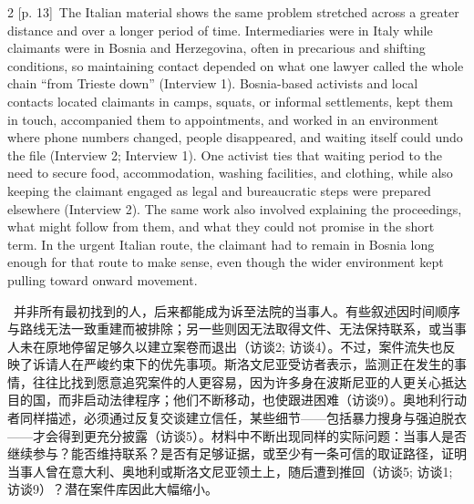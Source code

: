 \documentclass[10pt,a4paper]{article}
\begin{document}
\begin{paracol}{2}
{\scriptsize\color{gray} [p. 13]}\ The Italian material shows the same problem stretched across a greater distance and over a longer period of time. Intermediaries were in Italy while claimants were in Bosnia and Herzegovina, often in precarious and shifting conditions, so maintaining contact depended on what one lawyer called the whole chain “from Trieste down” (Interview 1). Bosnia-based activists and local contacts located claimants in camps, squats, or informal settlements, kept them in touch, accompanied them to appointments, and worked in an environment where phone numbers changed, people disappeared, and waiting itself could undo the file (Interview 2; Interview 1). One activist ties that waiting period to the need to secure food, accommodation, washing facilities, and clothing, while also keeping the claimant engaged as legal and bureaucratic steps were prepared elsewhere (Interview 2). The same work also involved explaining the proceedings, what might follow from them, and what they could not promise in the short term. In the urgent Italian route, the claimant had to remain in Bosnia long enough for that route to make sense, even though the wider environment kept pulling toward onward movement.\par
\switchcolumn*
{\scriptsize\color{gray} [p. 14]}\ 并非所有最初找到的人，后来都能成为诉至法院的当事人。有些叙述因时间顺序与路线无法一致重建而被排除；另一些则因无法取得文件、无法保持联系，或当事人未在原地停留足够久以建立案卷而退出（访谈2; 访谈4）。不过，案件流失也反映了诉请人在严峻约束下的优先事项。斯洛文尼亚受访者表示，监测正在发生的事情，往往比找到愿意追究案件的人更容易，因为许多身在波斯尼亚的人更关心抵达目的国，而非启动法律程序；他们不断移动，也使跟进困难（访谈9）。奥地利行动者同样描述，必须通过反复交谈建立信任，某些细节——包括暴力搜身与强迫脱衣——才会得到更充分披露（访谈5）。材料中不断出现同样的实际问题：当事人是否继续参与？能否维持联系？是否有足够证据，或至少有一条可信的取证路径，证明当事人曾在意大利、奥地利或斯洛文尼亚领土上，随后遭到推回（访谈5; 访谈1; 访谈9）？潜在案件库因此大幅缩小。\par
\switchcolumn

\end{paracol}
\end{document}
